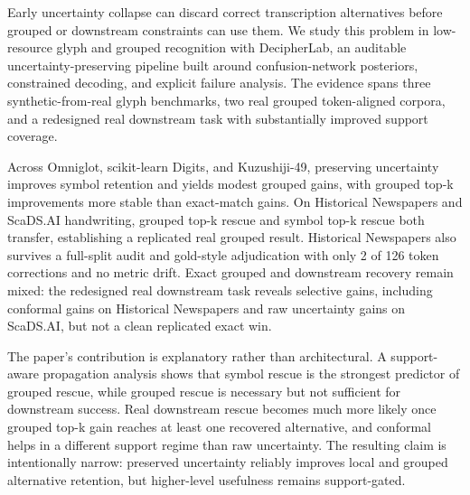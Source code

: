 Early uncertainty collapse can discard correct transcription alternatives before grouped or downstream constraints can use them. We study this problem in low-resource glyph and grouped recognition with DecipherLab, an auditable uncertainty-preserving pipeline built around confusion-network posteriors, constrained decoding, and explicit failure analysis. The evidence spans three synthetic-from-real glyph benchmarks, two real grouped token-aligned corpora, and a redesigned real downstream task with substantially improved support coverage.

Across Omniglot, scikit-learn Digits, and Kuzushiji-49, preserving uncertainty improves symbol retention and yields modest grouped gains, with grouped top-k improvements more stable than exact-match gains. On Historical Newspapers and ScaDS.AI handwriting, grouped top-k rescue and symbol top-k rescue both transfer, establishing a replicated real grouped result. Historical Newspapers also survives a full-split audit and gold-style adjudication with only 2 of 126 token corrections and no metric drift. Exact grouped and downstream recovery remain mixed: the redesigned real downstream task reveals selective gains, including conformal gains on Historical Newspapers and raw uncertainty gains on ScaDS.AI, but not a clean replicated exact win.

The paper's contribution is explanatory rather than architectural. A support-aware propagation analysis shows that symbol rescue is the strongest predictor of grouped rescue, while grouped rescue is necessary but not sufficient for downstream success. Real downstream rescue becomes much more likely once grouped top-k gain reaches at least one recovered alternative, and conformal helps in a different support regime than raw uncertainty. The resulting claim is intentionally narrow: preserved uncertainty reliably improves local and grouped alternative retention, but higher-level usefulness remains support-gated.
